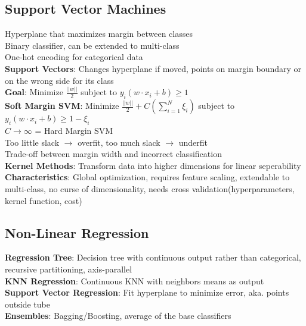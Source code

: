 \documentclass{article}
\begin{document}
\begin{multicols*}{2}
        \subsection*{Support Vector Machines}
        Hyperplane that maximizes margin between classes\\
        Binary classifier, can be extended to multi-class\\
        One-hot encoding for categorical data\\
        \textbf{Support Vectors}: Changes hyperplane if moved, points on margin boundary or on
        the wrong side for its class\\
        \textbf{Goal}: Minimize $\frac{\lvert\lvert w \rvert\rvert}{2}$ subject to $y_i(w \cdot
        x_i + b) \geq 1$\\
        \textbf{Soft Margin SVM}: Minimize $\frac{\lvert\lvert w \rvert\rvert}{2} + C(\sum_{i=1}^{N} \xi_i)$
        subject to $y_i(w \cdot x_i + b) \geq 1 - \xi_i$\\
        $C \to \infty$ = Hard Margin SVM\\
        Too little slack $\to$ overfit, too much slack $\to$ underfit\\
        Trade-off between margin width and incorrect classification\\
        \textbf{Kernel Methods}: Transform data into higher dimensions for linear seperability\\
        \textbf{Characteristics}: Global optimization, requires feature scaling, extendable to
        multi-class, no curse of dimensionality, needs cross validation(hyperparameters, kernel
        function, cost)\\
        \subsection*{Non-Linear Regression}
        \textbf{Regression Tree}: Decision tree with continuous output rather than
        categorical, recursive partitioning, axis-parallel\\
        \textbf{KNN Regression}: Continuous KNN with neighbors means as output\\
        \textbf{Support Vector Regression}: Fit hyperplane to minimize error,
        aka.
        points outside tube\\
        \textbf{Ensembles}: Bagging/Boosting, average of the base classifiers\\
    \end{multicols*}
\end{document}
